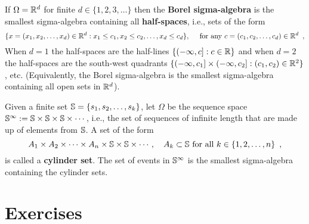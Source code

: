 \item
If $\Omega = \mathbb{R}^d$ for finite $d \in \{1,2,3,\ldots\}$ then the {\bf Borel sigma-algebra} is the smallest sigma-algebra containing 
all {\bf half-spaces}, i.e., sets of the form 
$$\{x=(x_1,x_2,\ldots,x_d) \in \mathbb{R}^d: x_1 \leq c_1, x_2 \leq c_2, \ldots, x_d \leq c_d\}, \quad \text{ for any } c=(c_1,c_2,\ldots,c_d)\in\mathbb{R}^d \enspace ,
$$
When $d=1$ the half-spaces are the half-lines $\{(-\infty,c]: c \in \mathbb{R}\}$ and when $d=2$ the half-spaces are the south-west quadrants $\{(-\infty,c_1]\times(-\infty,c_2] : (c_1,c_2) \in \mathbb{R}^2\}$, etc.  
(Equivalently, the Borel sigma-algebra is the smallest sigma-algebra containing all open sets in $\mathbb{R}^d$). 

\item
Given a finite set $\mathbb{S}=\{s_1,s_2,\ldots,s_k\}$, let $\Omega$ be the sequence space $\mathbb{S}^{\infty}:=\mathbb{S} \times \mathbb{S} \times \mathbb{S} \times\cdots$, i.e., the set of sequences of infinite length that are made up of elements from $\mathbb{S}$.  
A set of the form
\[
A_1 \times A_2 \times \cdots \times A_n \times \mathbb{S} \times \mathbb{S} \times \cdots, \quad A_k \subset \mathbb{S} \text{ for all } k \in \{1,2,\ldots,n\} \enspace ,
\]
is called a {\bf cylinder set}.  
The set of events in $\mathbb{S}^{\infty}$ is the smallest sigma-algebra containing the cylinder sets.

\ee

\section*{Exercises}

